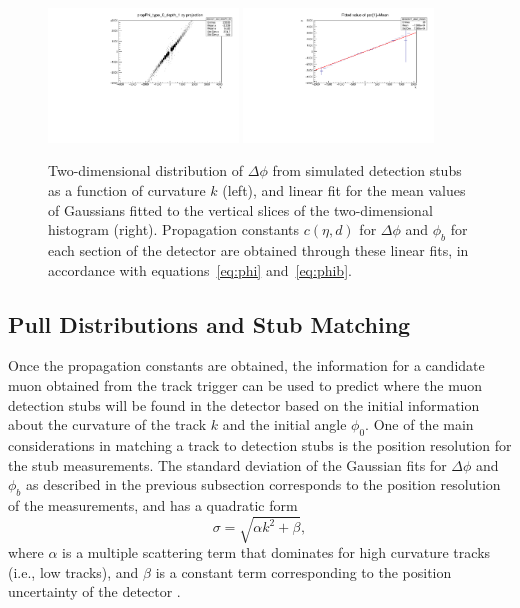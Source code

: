 \begin{figure}[htbp] %
  \centering
  \includegraphics[width=0.45\textwidth]{fig/TPS/deltaPhi_2D.pdf}
  \includegraphics[width=0.45\textwidth]{fig/TPS/deltaPhi_mean.pdf}\\
  \caption{
    Two-dimensional distribution of $\Delta\phi$ from simulated detection stubs as a function of curvature $k$ (left), and linear fit for the mean values of Gaussians fitted to the vertical slices of the two-dimensional histogram (right).
    Propagation constants $c(\eta,d)$ for $\Delta\phi$ and $\phi_b$ for each section of the detector are obtained through these linear fits, in accordance with equations~\ref{eq:phi} and~\ref{eq:phib}.
  }
  \label{fig:deltaPhiHist}
\end{figure}

\subsection{Pull Distributions and Stub Matching}
\label{subsec:pulls}

Once the propagation constants are obtained, the information for a candidate muon obtained from the track trigger can be used to predict where the muon detection stubs will be found in the detector based on the initial information about the curvature of the track $k$ and the initial angle $\phi_0$.
One of the main considerations in matching a track to detection stubs is the position resolution for the stub measurements.
The standard deviation of the Gaussian fits for $\Delta\phi$ and $\phi_b$ as described in the previous subsection corresponds to the position resolution of the measurements, and has a quadratic form
\begin{equation}
  \sigma=\sqrt{\alpha k^2+\beta},
\end{equation}
where $\alpha$ is a multiple scattering term that dominates for high curvature tracks (i.e., low \pt tracks), and $\beta$ is a constant term corresponding to the position uncertainty of the detector \cite{PhysRevD.98.030001}.

